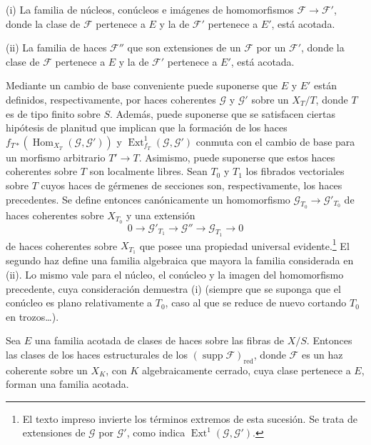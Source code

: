 \medskip
\noindent (i) La familia de núcleos, conúcleos e imágenes de homomorfismos
$\mathcal F\longrightarrow\mathcal F'$, donde la clase de $\mathcal F$
pertenece a $E$ y la de $\mathcal F'$ pertenece a $E'$, está acotada.

\smallskip
\noindent (ii) La familia de haces $\mathcal F''$ que son extensiones de un
$\mathcal F$ por un $\mathcal F'$, donde la clase de $\mathcal F$ pertenece a
$E$ y la de $\mathcal F'$ pertenece a $E'$, está acotada.

Mediante un cambio de base conveniente puede suponerse que $E$ y $E'$ están
definidos, respectivamente, por haces coherentes $\mathcal G$ y $\mathcal G'$
sobre un $X_T/T$, donde $T$ es de tipo finito sobre $S$. Además, puede
suponerse que se satisfacen ciertas hipótesis de planitud que implican que la
formación de los haces
$f_{T*}(\operatorname{Hom}_{X_T}(\mathcal G,\mathcal G'))$ y
$\operatorname{Ext}^{1}_{f_T}(\mathcal G,\mathcal G')$ conmuta con el cambio
de base para un morfismo arbitrario $T'\longrightarrow T$. Asimismo, puede
suponerse que estos haces coherentes sobre $T$ son localmente libres. Sean
$T_0$ y $T_1$ los fibrados vectoriales sobre $T$ cuyos haces de gérmenes de
secciones son, respectivamente, los haces precedentes. Se define entonces
canónicamente un homomorfismo
$\mathcal G_{T_0}\longrightarrow\mathcal G'_{T_0}$ de haces coherentes sobre
$X_{T_0}$ y una extensión
\[
0\longrightarrow\mathcal G'_{T_1}\longrightarrow\mathcal G''
\longrightarrow\mathcal G_{T_1}\longrightarrow0
\]
de haces coherentes sobre $X_{T_1}$ que posee una propiedad universal
evidente.\footnote{El texto impreso invierte los términos extremos de esta sucesión. Se trata de extensiones de $\mathcal G$ por $\mathcal G'$, como indica $\operatorname{Ext}^1(\mathcal G,\mathcal G')$.} El segundo haz define una familia algebraica que mayora la familia
considerada en (ii). Lo mismo vale para el núcleo, el conúcleo y la imagen del
homomorfismo
precedente, cuya consideración demuestra (i) (siempre que se suponga que el
conúcleo es plano relativamente a $T_0$, caso al que se reduce de nuevo
cortando $T_0$ en trozos\ldots).

 Sea $E$ una familia acotada de clases de haces sobre
las fibras de $X/S$. Entonces las clases de los haces estructurales de los
$(\operatorname{supp}\mathcal F)_{\mathrm{red}}$, donde $\mathcal F$ es un
haz coherente sobre un $X_K$, con $K$ algebraicamente cerrado, cuya clase
pertenece a $E$, forman una familia acotada.


